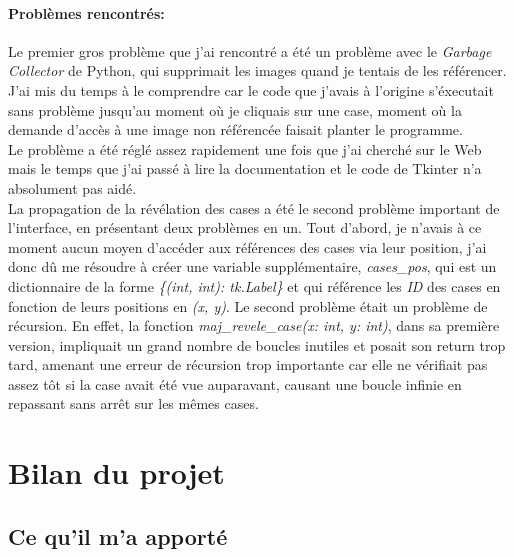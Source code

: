 \documentclass[12pt, a4paper]{article}
\begin{document}
\paragraph{Problèmes rencontrés:}
Le premier gros problème que j'ai rencontré a été un problème avec le
\emph{Garbage Collector} de Python, qui supprimait les images quand je tentais
de les référencer. J'ai mis du temps à le comprendre car le code que j'avais
à l'origine s'éxecutait sans problème jusqu'au moment où je cliquais sur une
case, moment où la demande d'accès à une image non référencée faisait planter
le programme. \\
Le problème a été réglé assez rapidement une fois que j'ai cherché sur le Web
mais le temps que j'ai passé à lire la documentation et le code de Tkinter
n'a absolument pas aidé. \\
La propagation de la révélation des cases a été le second problème important de
l'interface, en présentant deux problèmes en un. Tout d'abord, je n'avais à ce
moment aucun moyen d'accéder aux références des cases via leur position, j'ai
donc dû me résoudre à créer une variable supplémentaire, \emph{cases\_pos}, qui
est un dictionnaire de la forme \emph{\{(int, int): tk.Label\}} et qui
référence les \emph{ID} des cases en fonction de leurs positions en
\emph{(x, y)}. Le second problème était un problème de récursion. En effet,
la fonction \emph{maj\_revele\_case(x: int, y: int)}, dans sa première version,
impliquait un grand nombre de boucles inutiles et posait son return trop tard,
amenant une erreur de récursion trop importante car elle ne vérifiait pas assez
tôt si la case avait été vue auparavant, causant une boucle infinie en
repassant sans arrêt sur les mêmes cases.


\newpage

\section{Bilan du projet}

\subsection{Ce qu'il m'a apporté}
\end{document}
